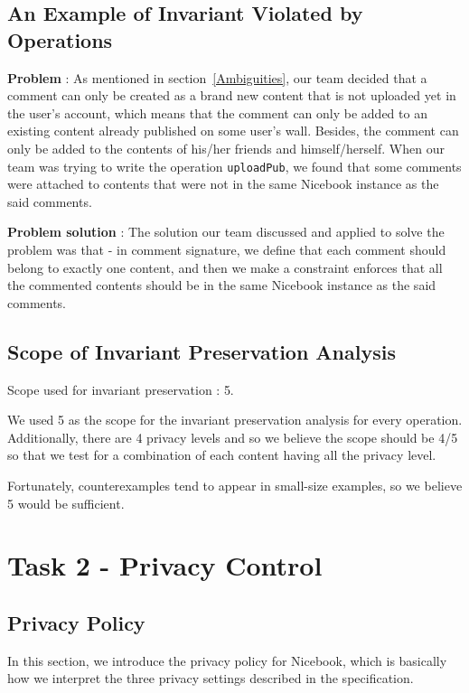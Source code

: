\documentclass[titlepage]{article}
\begin{document}
\subsection{An Example of Invariant Violated by Operations}

\textbf{Problem} : As mentioned in section~\ref{Ambiguities}, our team decided that a comment can only be created as a brand new content that is not uploaded yet in the user’s account, which means that the comment can only be added to an existing content already published on some user’s wall. Besides, the comment can only be added to the contents of his/her friends and himself/herself. When our team was trying to write the operation \texttt{uploadPub}, we found that some comments were attached to contents that were not in the same Nicebook instance as the said comments.

\textbf{Problem solution} : The solution our team discussed and applied to solve the problem was that - in comment signature, we define that each comment should belong to exactly one content, and then we make a constraint enforces that all the commented contents should be in the same Nicebook instance as the said comments.
      
    
\subsection{Scope of Invariant Preservation Analysis}
Scope used for invariant preservation : 5.

We used 5 as the scope for the invariant preservation analysis for every operation. Additionally, there are 4 privacy levels and so we believe the scope should be 4/5 so that we test for a combination of each content having all the privacy level.

Fortunately, counterexamples tend to appear in small-size examples, so we believe 5 would be sufficient.

\section{Task 2 - Privacy Control}
\subsection{Privacy Policy}
In this section, we introduce the privacy policy for Nicebook, which is basically how we interpret the three privacy settings described in the specification.
\end{document}
